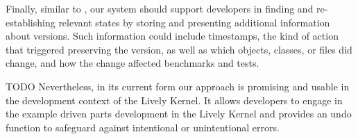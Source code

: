 Finally, similar to \coexist, our system should support developers in finding and re-establishing relevant states by storing and presenting additional information about versions. Such information could include timestamps, the kind of action that triggered preserving the version, as well as which objects, classes, or files did change, and how the change affected benchmarks and tests.

TODO
Nevertheless, in its current form our approach is promising and usable in the development context of the Lively Kernel.
It allows developers to engage in the example driven parts development in the Lively Kernel and provides an undo function to safeguard against intentional or unintentional errors.

